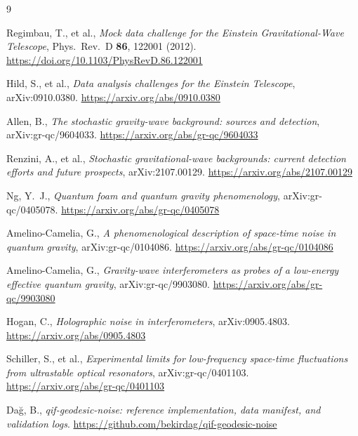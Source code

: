 \documentclass[11pt]{article}
\begin{document}
\begin{thebibliography}{9}

 Regimbau, T., et al., \emph{Mock data challenge for the Einstein Gravitational-Wave Telescope}, Phys.\ Rev.\ D \textbf{86}, 122001 (2012). \url{https://doi.org/10.1103/PhysRevD.86.122001}

 Hild, S., et al., \emph{Data analysis challenges for the Einstein Telescope}, arXiv:0910.0380. \url{https://arxiv.org/abs/0910.0380}

 Allen, B., \emph{The stochastic gravity-wave background: sources and detection}, arXiv:gr-qc/9604033. \url{https://arxiv.org/abs/gr-qc/9604033}

 Renzini, A., et al., \emph{Stochastic gravitational-wave backgrounds: current detection efforts and future prospects}, arXiv:2107.00129. \url{https://arxiv.org/abs/2107.00129}

 Ng, Y.~J., \emph{Quantum foam and quantum gravity phenomenology}, arXiv:gr-qc/0405078. \url{https://arxiv.org/abs/gr-qc/0405078}

 Amelino-Camelia, G., \emph{A phenomenological description of space-time noise in quantum gravity}, arXiv:gr-qc/0104086. \url{https://arxiv.org/abs/gr-qc/0104086}

 Amelino-Camelia, G., \emph{Gravity-wave interferometers as probes of a low-energy effective quantum gravity}, arXiv:gr-qc/9903080. \url{https://arxiv.org/abs/gr-qc/9903080}

 Hogan, C., \emph{Holographic noise in interferometers}, arXiv:0905.4803. \url{https://arxiv.org/abs/0905.4803}

 Schiller, S., et al., \emph{Experimental limits for low-frequency space-time fluctuations from ultrastable optical resonators}, arXiv:gr-qc/0401103. \url{https://arxiv.org/abs/gr-qc/0401103}

 Da\u{g}, B., \emph{qif-geodesic-noise: reference implementation, data manifest, and validation logs}. \url{https://github.com/bekirdag/qif-geodesic-noise}

\end{thebibliography}
\end{document}
